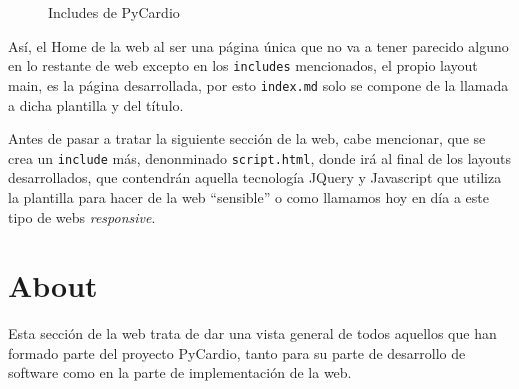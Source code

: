 \begin{figure}[H]
    \centering
    \caption{Includes de PyCardio}
    \label{fig:includ}
\end{figure}

Así, el Home de la web al ser una página única que no va a tener parecido alguno en lo restante de web excepto en los \texttt{includes} mencionados, el propio layout main, es la página desarrollada, por esto \texttt{index.md} solo se compone de la llamada a dicha plantilla y del título. 

Antes de pasar a tratar la siguiente sección de la web, cabe mencionar, que se crea un \texttt{include} más, denonminado \texttt{script.html}, donde irá al final de los layouts desarrollados, que contendrán aquella tecnología JQuery y Javascript que utiliza la plantilla para hacer de la web   ``sensible'' o como llamamos hoy en día a este tipo de webs \textit{responsive}.
\section{About}
\label{sec:aboutWeb}
Esta sección de la web trata de dar una vista general de todos aquellos que han formado parte del proyecto PyCardio, tanto para su parte de desarrollo de software como en la parte de implementación de la web. 

